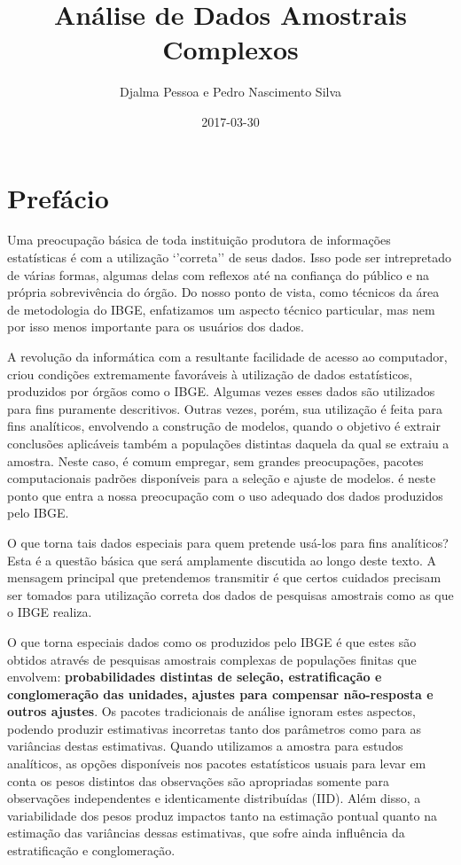 \documentclass[]{book}
\title{Análise de Dados Amostrais Complexos}
\author{Djalma Pessoa e Pedro Nascimento Silva}
\date{2017-03-30}
\numberwithin{example}{chapter}
\numberwithin{remark}{chapter}
\numberwithin{definition}{chapter}
\begin{document}
\maketitle

{
\setcounter{tocdepth}{1}
\tableofcontents
}
\chapter*{Prefácio}\label{prefacio}

Uma preocupação básica de toda instituição produtora de informações
estatísticas é com a utilização `'correta'' de seus dados. Isso pode ser
intrepretado de várias formas, algumas delas com reflexos até na
confiança do público e na própria sobrevivência do órgão. Do nosso ponto
de vista, como técnicos da área de metodologia do IBGE, enfatizamos um
aspecto técnico particular, mas nem por isso menos importante para os
usuários dos dados.

A revolução da informática com a resultante facilidade de acesso ao
computador, criou condições extremamente favoráveis à utilização de
dados estatísticos, produzidos por órgãos como o IBGE. Algumas vezes
esses dados são utilizados para fins puramente descritivos. Outras
vezes, porém, sua utilização é feita para fins analíticos, envolvendo a
construção de modelos, quando o objetivo é extrair conclusões aplicáveis
também a populações distintas daquela da qual se extraiu a amostra.
Neste caso, é comum empregar, sem grandes preocupações, pacotes
computacionais padrões disponíveis para a seleção e ajuste de modelos. é
neste ponto que entra a nossa preocupação com o uso adequado dos dados
produzidos pelo IBGE.

O que torna tais dados especiais para quem pretende usá-los para fins
analíticos? Esta é a questão básica que será amplamente discutida ao
longo deste texto. A mensagem principal que pretendemos transmitir é que
certos cuidados precisam ser tomados para utilização correta dos dados
de pesquisas amostrais como as que o IBGE realiza.

O que torna especiais dados como os produzidos pelo IBGE é que estes são
obtidos através de pesquisas amostrais complexas de populações finitas
que envolvem: \textbf{probabilidades distintas de seleção,
estratificação e conglomeração das unidades, ajustes para compensar
não-resposta e outros ajustes}. Os pacotes tradicionais de análise
ignoram estes aspectos, podendo produzir estimativas incorretas tanto
dos parâmetros como para as variâncias destas estimativas. Quando
utilizamos a amostra para estudos analíticos, as opções disponíveis nos
pacotes estatísticos usuais para levar em conta os pesos distintos das
observações são apropriadas somente para observações independentes e
identicamente distribuídas (IID). Além disso, a variabilidade dos pesos
produz impactos tanto na estimação pontual quanto na estimação das
variâncias dessas estimativas, que sofre ainda influência da
estratificação e conglomeração.
\end{document}

